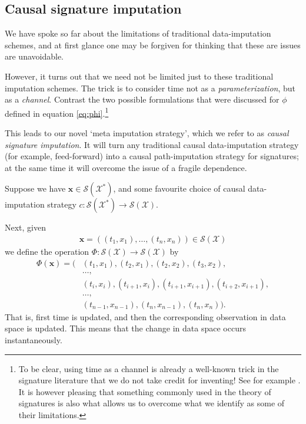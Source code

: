 \documentclass{article}
\newcommand{\dataspace}{\mathcal{X}}
\newcommand{\seriesspace}{\mathcal{S}}
\begin{document}
\subsection{Causal signature imputation}
We have spoke so far about the limitations of traditional data-imputation schemes, and at first glance one may be forgiven for thinking that these are issues are unavoidable. 

However, it turns out that we need not be limited just to these traditional imputation schemes. The trick is to consider time not as a \emph{parameterization}, but as a \emph{channel}. Contrast the two possible formulations that were discussed for $\phi$ defined in equation \eqref{eq:phi}.\footnote{To be clear, using time as a channel is already a well-known trick in the signature literature that we do not take credit for inventing! See for example \cite[Definition A.3]{kidger2019deep}. It is however pleasing that something commonly used in the theory of signatures is also what allows us to overcome what we identify as some of their limitations.}

This leads to our novel `meta imputation strategy', which we refer to as \emph{causal signature imputation}. It will turn any traditional causal data-imputation strategy (for example, feed-forward) into a causal path-imputation strategy for signatures; at the same time it will overcome the issue of a fragile dependence.

Suppose we have $\mathbf{x} \in \seriesspace(\dataspace^*)$, and some favourite choice of causal data-imputation strategy $c \colon \seriesspace(\dataspace^*) \to \seriesspace(\dataspace)$.

Next, given
\begin{align*}
    \mathbf{x} = ((t_1, x_1), \ldots, (t_n, x_n)) \in \seriesspace(\dataspace)
\end{align*}
we define the operation $\Phi \colon \seriesspace(\dataspace) \to \seriesspace(\dataspace)$ by
\begin{align}
    \Phi(\mathbf{x}) = (&(t_1, x_1), (t_2, x_1), (t_2, x_2),(t_3, x_2),\nonumber\\
    &\ldots,\nonumber\\
    &(t_i, x_i), (t_{i + 1}, x_i), (t_{i + 1}, x_{i + 1}), (t_{i + 2}, x_{i + 1}),\nonumber\\
    &\ldots,\nonumber\\
    &(t_{n - 1}, x_{n - 1}), (t_n, x_{n - 1}),(t_n, x_n)).\label{eq:causalsig}
\end{align}
That is, first time is updated, and then the corresponding observation in data space is updated. This means that the change in data space occurs instantaneously.
\end{document}
